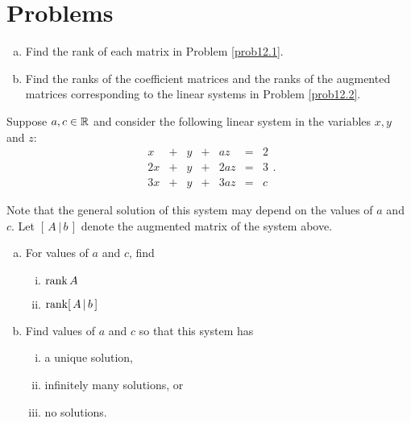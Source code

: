 \section*{Problems}




\begin{prob} \label{prob13.1} 

 

\begin{enumerate}[a)]

\item Find the rank of each matrix in Problem \ref{prob12.1}.
\medskip
%
\item\sov Find the ranks of the coefficient matrices and the ranks of the augmented matrices corresponding to the linear systems in Problem \ref{prob12.2}.

\medskip 
%

\end{enumerate}
\end{prob} \begin{prob} \label{prob13.2} Suppose $a,c\in \mathbb{R}$ and consider the following linear system
in the variables
$x,y$ and $z$: 
$$\begin{matrix}  x&+&y &+&az&=&2\\
2x&+&y&+&2a z  &=&3\\ 
3x&+&y &+&3az&=&c \end{matrix}. $$

Note that the general solution of this system may depend on the
values of $a$ and $c$.
Let $[\,A\,|\, b\,]$ denote  the
augmented matrix of the
system above.

\begin{enumerate}[a)]
\item  For 
 values of
$a$ and $c$, find\smallskip
\begin{enumerate}[(i)]
\item 
$\operatorname{rank} A$
\smallskip
\item  $\operatorname{rank}[\,A\,|\, b\,]$  
\end{enumerate}

\item\sov  Find  values of
$a$ and $c$ so that
this system has \smallskip
\begin{enumerate}[(i)]
 
\item a unique solution,\smallskip
\item  infinitely many
solutions,  or \smallskip
\item  
no solutions. 
\end{enumerate}


\end{enumerate}
\end{prob}
